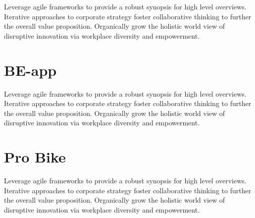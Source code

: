 Leverage agile frameworks to provide a robust synopsis for high level overviews. Iterative approaches to corporate strategy foster collaborative thinking to further the overall value proposition. Organically grow the holistic world view of disruptive innovation via workplace diversity and empowerment.\\

\section{BE-app}

Leverage agile frameworks to provide a robust synopsis for high level overviews. Iterative approaches to corporate strategy foster collaborative thinking to further the overall value proposition. Organically grow the holistic world view of disruptive innovation via workplace diversity and empowerment.\\

\section{Pro Bike}
Leverage agile frameworks to provide a robust synopsis for high level overviews. Iterative approaches to corporate strategy foster collaborative thinking to further the overall value proposition. Organically grow the holistic world view of disruptive innovation via workplace diversity and empowerment.\\